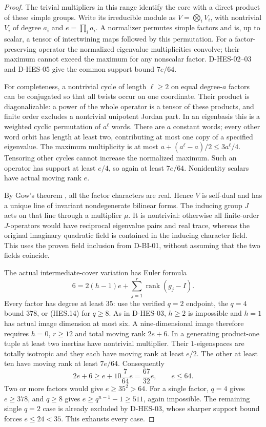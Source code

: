 \begin{proof}
The trivial multipliers in this range identify the core with a direct
product of these simple groups. Write its irreducible module as
$V=\bigotimes_i V_i$, with nontrivial $V_i$ of degree $a_i$ and
$e=\prod_i a_i$. A normalizer permutes simple factors and is, up to
scalar, a tensor of intertwining maps followed by this permutation.
For a factor-preserving operator the normalized eigenvalue
multiplicities convolve; their maximum cannot exceed the maximum for
any nonscalar factor. D-HES-02--03 and D-HES-05 give the common support
bound $7e/64$.

For completeness, a nontrivial cycle of length $\ell\ge2$ on equal
degree-$a$ factors can be conjugated so that all twists occur on one
coordinate. Their product is diagonalizable: a power of the whole
operator is a tensor of these products, and finite order excludes a
nontrivial unipotent Jordan part. In an eigenbasis this is a weighted
cyclic permutation of $a^\ell$ words. There are $a$ constant words;
every other word orbit has length at least two, contributing at most
one copy of a specified eigenvalue. The maximum multiplicity is at
most $a+(a^\ell-a)/2\le3a^\ell/4$. Tensoring other cycles cannot
increase the normalized maximum. Such an operator has support at
least $e/4$, so again at least $7e/64$. Nonidentity scalars have actual
moving rank $e$.

By Gow's theorem \cite[p.~583 and Section~3]{HES:Gow1981}, all the
factor characters are real. Hence $V$ is self-dual and has a unique
line of invariant nondegenerate bilinear forms. The inducing group
$J$ acts on that line through a multiplier $\mu$. It is nontrivial:
otherwise all finite-order $J$-operators would have reciprocal
eigenvalue pairs and real trace, whereas the original imaginary
quadratic field is contained in the inducing character field. This
uses the proven field inclusion from D-BI-01, without assuming that
the two fields coincide.

The actual intermediate-cover variation has Euler formula
\[
                   6=2(h-1)e+\sum_{j=1}^r\operatorname{rank}(g_j-I).
\tag{HES.23}
\]
Every factor has degree at least $35$: use the verified $q=2$ endpoint,
the $q=4$ bound $378$, or (HES.14) for $q\ge8$.
As in D-HES-03, $h\ge2$ is impossible and $h=1$ has actual image
dimension at most six. A nine-dimensional image therefore requires
$h=0$, $r\ge12$ and total moving rank $2e+6$.
In a generating product-one tuple at least two inertias have
nontrivial multiplier. Their $1$-eigenspaces are totally isotropic
and they each have moving rank at least $e/2$. The other at least
ten have moving rank at least $7e/64$. Consequently
\[
               2e+6\ge e+10\frac7{64}e=\frac{67}{32}e,
                            \qquad e\le64.
\tag{HES.24}
\]
Two or more factors would give $e\ge35^2>64$. For a single factor,
$q=4$ gives $e\ge378$, and $q\ge8$ gives
$e\ge q^{n-1}-1\ge511$, again impossible. The remaining single
$q=2$ case is already excluded by D-HES-03, whose sharper support
bound forces $e\le24<35$. This exhausts every case.
\end{proof}

